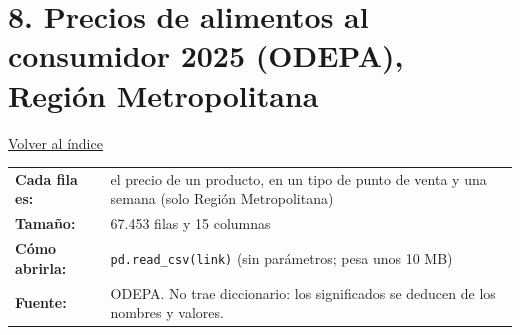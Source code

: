 \documentclass[10.5pt]{article}
\begin{document}
\section*{8. Precios de alimentos al consumidor 2025 (ODEPA), Región Metropolitana}
\vspace{-6pt}\hfill{\small\hyperlink{indice}{\textcolor{azuloscuro}{\underline{Volver al índice}}}}\par\vspace{2pt}
\begin{tabularx}{\linewidth}{@{}l X@{}}\textbf{Cada fila es:} & el precio de un producto, en un tipo de punto de venta y una semana (solo Región Metropolitana) \\\textbf{Tamaño:} & 67.453 filas y 15 columnas \\\textbf{Cómo abrirla:} & \texttt{pd.read\_\allowbreak{}csv(link)} (sin parámetros; pesa unos 10 MB) \\\textbf{Fuente:} & ODEPA. No trae diccionario: los significados se deducen de los nombres y valores. \\\end{tabularx}
\vspace{6pt}
\end{document}
